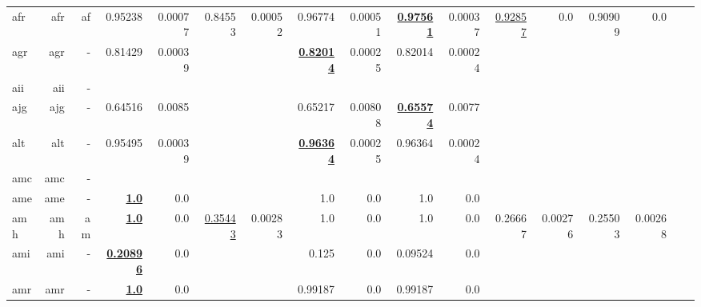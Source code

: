 \documentclass[11pt]{article}
\begin{document}
\begin{table*}[h]
{\begin{tabular}{lrrrrrrrrrrrrrrrr}
afr         & afr         & af         & 0.95238         & 0.00077         & 0.84553         & 0.00052         & 0.96774         & 0.00051         & \textbf{\underline{0.97561}}         & 0.00037         & \underline{0.92857}         & 0.0         & 0.90909         & 0.0         \\
agr         & agr         & -         & 0.81429         & 0.00039         &          &          & \textbf{\underline{0.82014}}         & 0.00025         & 0.82014         & 0.00024         &          &          &          &          \\
aii         & aii         & -         &          &          &          &          &          &          &          &          &          &          &          &          \\
ajg         & ajg         & -         & 0.64516         & 0.0085         &          &          & 0.65217         & 0.00808         & \textbf{\underline{0.65574}}         & 0.0077         &          &          &          &          \\
alt         & alt         & -         & 0.95495         & 0.00039         &          &          & \textbf{\underline{0.96364}}         & 0.00025         & 0.96364         & 0.00024         &          &          &          &          \\
amc         & amc         & -         &          &          &          &          &          &          &          &          &          &          &          &          \\
ame         & ame         & -         & \textbf{\underline{1.0}}         & 0.0         &          &          & 1.0         & 0.0         & 1.0         & 0.0         &          &          &          &          \\
amh         & amh         & am         & \textbf{\underline{1.0}}         & 0.0         & \underline{0.35443}         & 0.00283         & 1.0         & 0.0         & 1.0         & 0.0         & 0.26667         & 0.00276         & 0.25503         & 0.00268         \\
ami         & ami         & -         & \textbf{\underline{0.20896}}         & 0.0         &          &          & 0.125         & 0.0         & 0.09524         & 0.0         &          &          &          &          \\
amr         & amr         & -         & \textbf{\underline{1.0}}         & 0.0         &          &          & 0.99187         & 0.0         & 0.99187         & 0.0         &          &          &          &          \\

\end{tabular}}
\end{table*}
\end{document}
